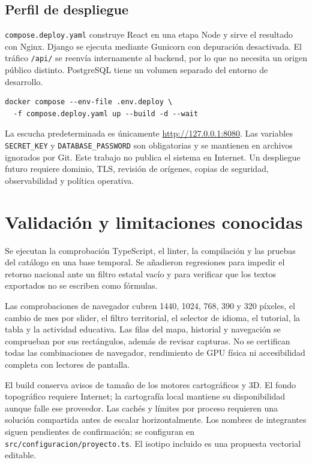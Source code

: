 \documentclass[11pt,a4paper]{article}
\begin{document}
\subsection{Perfil de despliegue}
\texttt{compose.deploy.yaml} construye React en una etapa Node y sirve el resultado con Nginx. Django se ejecuta mediante Gunicorn con depuración desactivada. El tráfico \texttt{/api/} se reenvía internamente al backend, por lo que no necesita un origen público distinto. PostgreSQL tiene un volumen separado del entorno de desarrollo.
\begin{verbatim}
docker compose --env-file .env.deploy \
  -f compose.deploy.yaml up --build -d --wait
\end{verbatim}
La escucha predeterminada es únicamente \url{http://127.0.0.1:8080}. Las variables \texttt{SECRET\_KEY} y \texttt{DATABASE\_PASSWORD} son obligatorias y se mantienen en archivos ignorados por Git. Este trabajo no publica el sistema en Internet. Un despliegue futuro requiere dominio, TLS, revisión de orígenes, copias de seguridad, observabilidad y política operativa.

\section{Validación y limitaciones conocidas}
Se ejecutan la comprobación TypeScript, el linter, la compilación y las pruebas del catálogo en una base temporal. Se añadieron regresiones para impedir el retorno nacional ante un filtro estatal vacío y para verificar que los textos exportados no se escriben como fórmulas.

Las comprobaciones de navegador cubren 1440, 1024, 768, 390 y 320 píxeles, el cambio de mes por slider, el filtro territorial, el selector de idioma, el tutorial, la tabla y la actividad educativa. Las filas del mapa, historial y navegación se comprueban por sus rectángulos, además de revisar capturas. No se certifican todas las combinaciones de navegador, rendimiento de GPU física ni accesibilidad completa con lectores de pantalla.

El build conserva avisos de tamaño de los motores cartográficos y 3D. El fondo topográfico requiere Internet; la cartografía local mantiene su disponibilidad aunque falle ese proveedor. Las cachés y límites por proceso requieren una solución compartida antes de escalar horizontalmente. Los nombres de integrantes siguen pendientes de confirmación; se configuran en \texttt{src/configuracion/proyecto.ts}. El isotipo incluido es una propuesta vectorial editable.
\end{document}
